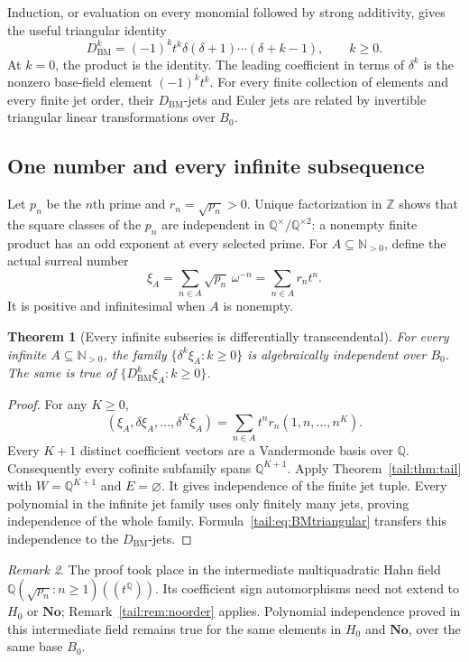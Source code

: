 \documentclass[11pt,a4paper]{article}
\numberwithin{equation}{section}
\newtheorem{theorem}{Theorem}[section]
\theoremstyle{definition}
\theoremstyle{remark}
\newtheorem{remark}[theorem]{Remark}
\newcommand{\No}{\mathbf{No}}
\newcommand{\Q}{\mathbb Q}
\newcommand{\N}{\mathbb N}
\newcommand{\Z}{\mathbb Z}
\newcommand{\BM}{D_{\mathrm{BM}}}
\newcommand{\EDer}{\delta}
\begin{document}
Induction, or evaluation on every monomial followed by strong additivity,
gives the useful triangular identity
\begin{equation}\label{tail:eq:BMtriangular}
 \BM^k=(-1)^k t^k\EDer(\EDer+1)\cdots(\EDer+k-1),
 \qquad k\geq0.
\end{equation}
At $k=0$, the product is the identity. The leading coefficient in terms
of $\EDer^k$ is the nonzero base-field element $(-1)^kt^k$.
For every finite collection of elements and every finite jet order,
their $\BM$-jets and Euler jets are related by invertible triangular
linear transformations over $B_0$.

\subsection{One number and every infinite subsequence}
Let $p_n$ be the $n$th prime and $r_n=\sqrt{p_n}>0$.
Unique factorization in $\Z$ shows that the square classes of the $p_n$
are independent in $\Q^\times/\Q^{\times2}$: a nonempty finite product
has an odd exponent at every selected prime. For $A\subseteq\N_{>0}$,
define the actual surreal number
\begin{equation}\label{tail:eq:xiA}
 \xi_A=\sum_{n\in A}\sqrt{p_n}\,\omega^{-n}
      =\sum_{n\in A}r_nt^n.
\end{equation}
It is positive and infinitesimal when $A$ is nonempty.

\begin{theorem}[Every infinite subseries is differentially transcendental]
\label{tail:thm:onesurreal}
For every infinite $A\subseteq\N_{>0}$, the family
$\{\EDer^k\xi_A:k\geq0\}$ is algebraically independent over $B_0$.
The same is true of $\{\BM^k\xi_A:k\geq0\}$.
\end{theorem}
\begin{proof}
For any $K\geq0$,
\[
 (\xi_A,\EDer\xi_A,\ldots,\EDer^K\xi_A)
   =\sum_{n\in A}t^nr_n(1,n,\ldots,n^K).
\]
Every $K+1$ distinct coefficient vectors are a Vandermonde basis over
$\Q$. Consequently every cofinite subfamily spans $\Q^{K+1}$.
Apply Theorem~\ref{tail:thm:tail} with $W=\Q^{K+1}$ and $E=\varnothing$.
It gives independence of the finite jet tuple. Every polynomial in the
infinite jet family uses only finitely many jets, proving independence
of the whole family. Formula~\eqref{tail:eq:BMtriangular} transfers this
independence to the $\BM$-jets.
\end{proof}

\begin{remark}
The proof took place in the intermediate multiquadratic Hahn field
$\Q(\sqrt{p_n}:n\geq1)((t^\Q))$. Its coefficient sign automorphisms need
not extend to $H_0$ or $\No$; Remark~\ref{tail:rem:noorder} applies. Polynomial
independence proved in this intermediate field remains true for the same
elements in $H_0$ and $\No$, over the same base $B_0$.
\end{remark}
\end{document}
